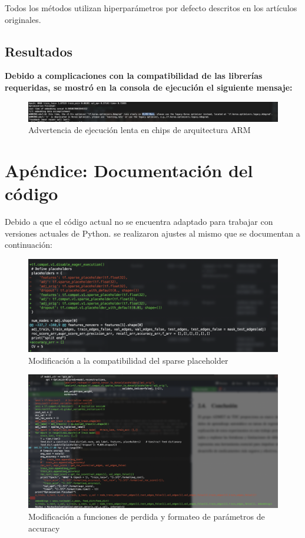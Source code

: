 Todos los métodos utilizan hiperparámetros por defecto descritos en los artículos originales.

\section{Resultados}

\textbf{Debido a complicaciones con la compatibilidad de las librerías requeridas, se mostró en la consola de ejecución el siguiente mensaje:}
\begin{figure}
    \centering
    \includegraphics[width=0.9\linewidth]{fig/warning.png}
    \caption{Advertencia de ejecución lenta en chips de arquitectura ARM}
    \label{fig:warninr}
\end{figure}


\chapter{Apéndice: Documentación del código}

Debido a que el código actual no se encuentra adaptado para trabajar con versiones actuales de Python. se realizaron ajustes al mismo que se documentan a continuación:

\begin{figure}
    \centering
    \includegraphics[width=1\linewidth]{fig/code_1.png}
    \caption{Modificación a la compatibilidad del sparse placeholder}
    \label{fig:enter-label}
\end{figure}

\begin{figure}
    \centering
    \includegraphics[width=1\linewidth]{fig/code2.png}
    \caption{Modificación a funciones de perdida y formateo de parámetros de accuracy}
    \label{fig:enter-label}
\end{figure}



